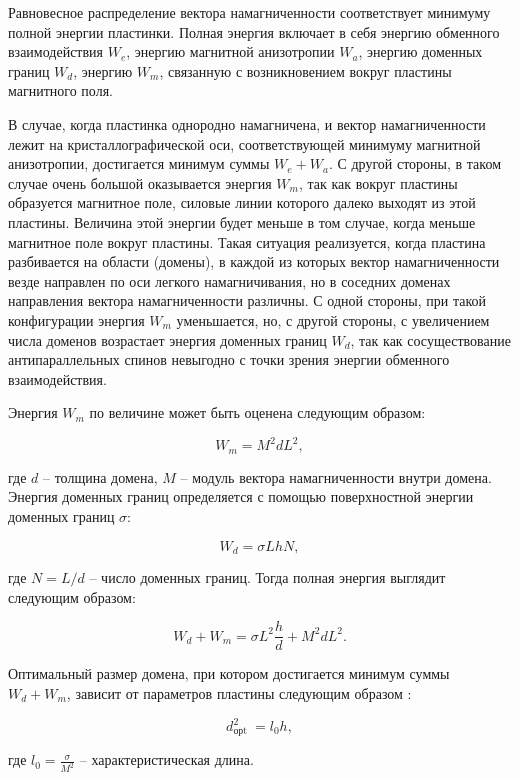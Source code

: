 \documentclass[a4paper,14pt]{article} %
\begin{document}
Равновесное распределение вектора намагниченности соответствует минимуму полной энергии пластинки. Полная энергия включает в себя энергию обменного взаимодействия $W_{e}$, энергию магнитной анизотропии $W_{a}$, энергию доменных границ $W_{d}$, энергию $W_{m}$, связанную с возникновением вокруг пластины магнитного поля.

В случае, когда пластинка однородно намагничена, и вектор намагниченности лежит на кристаллографической оси, соответствующей минимуму магнитной анизотропии, достигается минимум суммы $W_{e}+W_{a} .$ С другой стороны, в таком случае очень большой оказывается энергия $W_{m}$, так как вокруг пластины образуется магнитное поле, силовые линии которого далеко выходят из этой пластины. Величина этой энергии будет меньше в том случае, когда меньше магнитное поле вокруг пластины. Такая ситуация реализуется, когда пластина разбивается на области (домены), в каждой из которых вектор намагниченности везде направлен по оси легкого намагничивания, но в соседних доменах направления вектора намагниченности различны. С одной стороны, при такой конфигурации энергия $W_{m}$ уменьшается, но, с другой стороны, с увеличением числа доменов возрастает энергия доменных границ $W_{d}$, так как сосуществование антипараллельных спинов невыгодно с точки зрения энергии обменного взаимодействия.

Энергия $W_{m}$ по величине может быть оценена следующим образом:

\[W_{m}=M^{2} d L^{2},\]

где $d$ -- толщина домена, $M$ -- модуль вектора намагниченности внутри домена.
Энергия доменных границ определяется с помощью поверхностной энергии доменных границ $\sigma:$

\[W_{d}=\sigma L h N,\]

где $N=L / d$ -- число доменных границ. Тогда полная энергия выглядит следующим образом:

\[W_{d}+W_{m}=\sigma L^{2} \frac{h}{d}+M^{2} d L^{2} .\]

Оптимальный размер домена, при котором достигается минимум суммы $W_{d}+W_{m}$, зависит от параметров пластины следующим образом :

\[d_{\text {орt }}^{2}=l_{0} h,\]

где $l_{0}=\frac{\sigma}{M^{2}}$ -- характеристическая длина.
\end{document}
